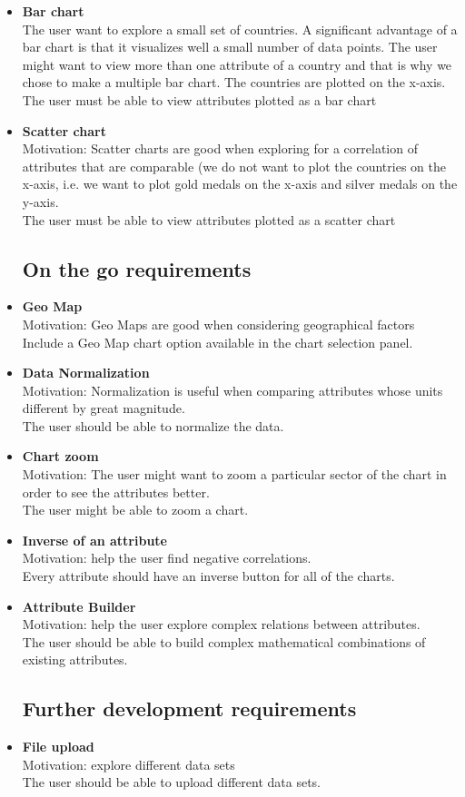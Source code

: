 \documentclass[a4paper]{article}
\begin{document}
\begin{itemize}
\item{\textbf{Bar chart}\\The user want to explore a small set of countries. A significant advantage of a bar chart is that it visualizes well a small number of data points. The user might want to view more than one attribute of a country and that is why we chose to make a multiple bar chart. The countries are plotted on the x-axis.\\The user must be able to view attributes plotted as a bar chart}
\item{\textbf{Scatter chart}\\Motivation: Scatter charts are good when exploring for a correlation of attributes that are comparable (we do not want to plot the countries on the x-axis, i.e. we want to plot gold medals on the x-axis and silver medals on the y-axis.\\The user must be able to view attributes plotted as a scatter chart}

\subsection{On the go requirements}
\item{\textbf{Geo Map}\\Motivation: Geo Maps are good when considering geographical factors\\Include a Geo Map chart option available in the chart selection panel.}
\item{\textbf{Data Normalization}\\Motivation: Normalization is useful when comparing attributes whose units different by great magnitude.\\The user should be able to normalize the data.}
\item{\textbf{Chart zoom}\\Motivation: The user might want to zoom a particular sector of the chart in order to see the attributes better.\\The user might be able to zoom a chart.}
\item{\textbf{Inverse of an attribute}\\ Motivation: help the user find negative correlations.\\Every attribute should have an inverse button for all of the charts.}
\item{\textbf{Attribute Builder}\\Motivation: help the user explore complex relations between attributes.\\The user should be able to build complex mathematical combinations of existing attributes.}

\subsection{Further development requirements}
\item{\textbf{File upload}\\Motivation: explore different data sets\\The user should be able to upload different data sets.}

\end{itemize}
\end{document}
